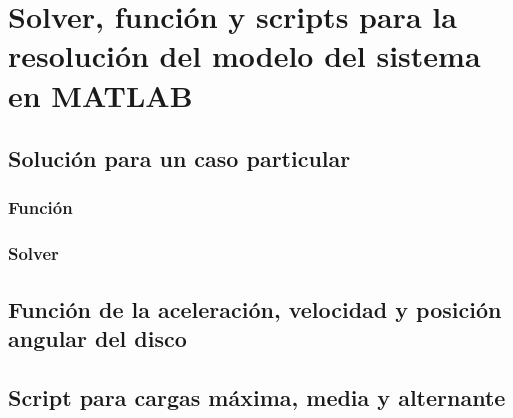 %
\chapter{Solver, función y scripts para la resolución del modelo del sistema en MATLAB}
\label{ch:anexo_c}

\section{Solución para un caso particular}
\label{sec:sol_part}

\subsection{Función}

\subsection{Solver}

\section{Función de la aceleración, velocidad y posición angular del disco}


\section{Script para cargas máxima, media y alternante}
